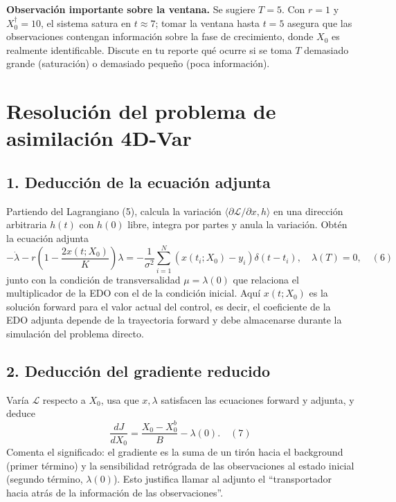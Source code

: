 \documentclass[12pt,spanish,mexico]{article}
\numberwithin{equation}{section}
\theoremstyle{definition}
\theoremstyle{remark}
\begin{document}
\textbf{Observación importante sobre la ventana.} Se sugiere \(T = 5\). Con \(r = 1\) y \(X_0^{\dagger} = 10\), el sistema satura en \(t \approx 7\); tomar la ventana hasta \(t = 5\) asegura que las observaciones contengan información sobre la fase de crecimiento, donde \(X_0\) es realmente identificable. Discute en tu reporte qué ocurre si se toma \(T\) demasiado grande (saturación) o demasiado pequeño (poca información).

\section{Resolución del problema de asimilación 4D-Var}

\subsection{1. Deducción de la ecuación adjunta}
Partiendo del Lagrangiano (5), calcula la variación \(\langle \partial\mathcal{L}/\partial x, h \rangle\) en una dirección arbitraria \(h(t)\) con \(h(0)\) libre, integra por partes y anula la variación. Obtén la ecuación adjunta
\[
-\dot{\lambda} - r \left( 1 - \frac{2x(t; X_0)}{K} \right) \lambda = -\frac{1}{\sigma^2} \sum_{i=1}^{N} \left( x(t_i; X_0) - y_i \right) \delta(t - t_i), \quad \lambda(T) = 0, \quad (6)
\]
junto con la condición de transversalidad \(\mu = \lambda(0)\) que relaciona el multiplicador de la EDO con el de la condición inicial. Aquí \(x(t; X_0)\) es la solución forward para el valor actual del control, es decir, el coeficiente de la EDO adjunta depende de la trayectoria forward y debe almacenarse durante la simulación del problema directo.

\subsection{2. Deducción del gradiente reducido}
Varía \(\mathcal{L}\) respecto a \(X_0\), usa que \(x, \lambda\) satisfacen las ecuaciones forward y adjunta, y deduce
\[
\frac{dJ}{dX_0} = \frac{X_0 - X_0^b}{B} - \lambda(0). \quad (7)
\]
Comenta el significado: el gradiente es la suma de un tirón hacia el background (primer término) y la sensibilidad retrógrada de las observaciones al estado inicial (segundo término, \(\lambda(0)\)). Esto justifica llamar al adjunto el “transportador hacia atrás de la información de las observaciones”.
\end{document}

